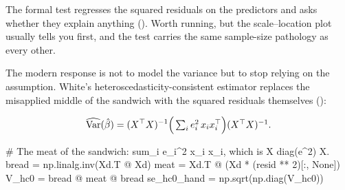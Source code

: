 \documentclass[
  letterpaper,
  10pt,
  twoside,
  openright,
  numbers=noenddot,
  chapterprefix=true]{scrbook}
\newenvironment{Shaded}{}{}
\newcommand{\CommentTok}[1]{\textcolor[rgb]{0.42,0.45,0.49}{#1}}
\newcommand{\DecValTok}[1]{\textcolor[rgb]{0.00,0.36,0.77}{#1}}
\newcommand{\NormalTok}[1]{\textcolor[rgb]{0.14,0.16,0.18}{#1}}
\newcommand{\OperatorTok}[1]{\textcolor[rgb]{0.14,0.16,0.18}{#1}}
\newcommand{\VariableTok}[1]{\textcolor[rgb]{0.89,0.38,0.04}{#1}}
\begin{document}
The formal test regresses the squared residuals on the predictors and
asks whether they explain anything (). Worth running, but the scale--location plot usually
tells you first, and the test carries the same sample-size pathology as
every other.

The modern response is not to model the variance but to stop relying on
the assumption. White's heteroscedasticity-consistent estimator replaces
the misapplied middle of the sandwich with the squared residuals
themselves ():

\[
\widehat{\mathrm{Var}}(\hat\beta)
= (X^{\top}X)^{-1}
\Big(\textstyle\sum_i e_i^2 \thinspace x_i x_i^{\top}\Big)
(X^{\top}X)^{-1}.
\]

\label{check-hc}
\begin{Shaded}
\begin{Highlighting}[]
\CommentTok{\# The meat of the sandwich: sum\_i e\_i\^{}2 x\_i x\_i\textquotesingle{}, which is X\textquotesingle{} diag(e\^{}2) X.}
\NormalTok{bread }\OperatorTok{=}\NormalTok{ np.linalg.inv(Xd.T }\OperatorTok{@}\NormalTok{ Xd)}
\NormalTok{meat }\OperatorTok{=}\NormalTok{ Xd.T }\OperatorTok{@}\NormalTok{ (Xd }\OperatorTok{*}\NormalTok{ (resid }\OperatorTok{**} \DecValTok{2}\NormalTok{)[:, }\VariableTok{None}\NormalTok{])}
\NormalTok{V\_hc0 }\OperatorTok{=}\NormalTok{ bread }\OperatorTok{@}\NormalTok{ meat }\OperatorTok{@}\NormalTok{ bread}
\NormalTok{se\_hc0\_hand }\OperatorTok{=}\NormalTok{ np.sqrt(np.diag(V\_hc0))}


\end{Highlighting}
\end{Shaded}
\end{document}
